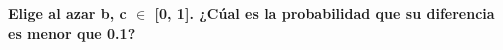 \item \textbf{Elige al azar b, c $\in$ [0, 1]. ¿Cúal es la probabilidad que su diferencia es menor que 0.1?}